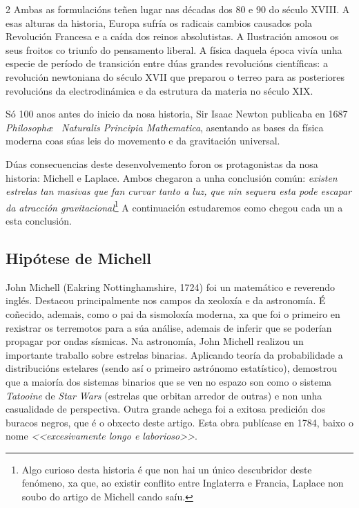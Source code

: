 \begin{multicols}{2}
Ambas as formulacións teñen lugar nas décadas dos 80 e 90 do século XVIII. A
esas alturas da historia, Europa sufría os radicais cambios causados pola
Revolución Francesa e a caída dos reinos absolutistas. A Ilustración amosou os
seus froitos co triunfo do pensamento liberal. A física daquela época vivía
unha especie de período de transición entre dúas grandes revolucións
científicas: a revolución newtoniana do século XVII que preparou o terreo para
as posteriores revolucións da electrodinámica e da estrutura da materia no
século XIX.

Só 100 anos antes do inicio da nosa historia, Sir Isaac Newton publicaba
en 1687 \textit{Philosoph\ae~ Naturalis Principia Mathematica}, asentando as
bases da física moderna coas súas leis do movemento e da gravitación universal.

Dúas consecuencias deste desenvolvemento foron os protagonistas da nosa
historia: Michell e Laplace. Ambos chegaron a unha conclusión común:
\emph{existen estrelas tan masivas que fan curvar tanto a luz, que nin sequera
esta pode escapar da atracción gravitacional}\footnote{Algo curioso desta
historia é que non hai un único descubridor deste fenómeno, xa que, ao existir
conflito entre Inglaterra e Francia, Laplace non soubo do artigo de Michell
cando saíu.} A continuación estudaremos como chegou cada un a esta conclusión.

\subsection*{Hipótese de Michell}

John Michell (Eakring Nottinghamshire, 1724) foi un matemático e reverendo
inglés. Destacou principalmente nos campos da xeoloxía e da astronomía. É
coñecido, ademais, como o pai da sismoloxía moderna, xa que foi o primeiro en
rexistrar os terremotos para a súa análise, ademais de inferir que se poderían
propagar por ondas sísmicas. Na astronomía, John Michell realizou un importante
traballo sobre estrelas binarias. Aplicando teoría da probabilidade a
distribucións estelares (sendo así o primeiro astrónomo estatístico),
demostrou que a maioría dos sistemas binarios que se ven no espazo son como o
sistema \textit{Tatooine} de \textit{Star Wars} (estrelas que orbitan arredor
de outras) e non unha casualidade de perspectiva. Outra grande achega foi a
exitosa predición dos buracos negros, que é o obxecto deste artigo. Esta obra
publícase en 1784, baixo o nome \textit{<<excesivamente longo e
laborioso>>}.\cite{mongomeri}


\end{multicols}
